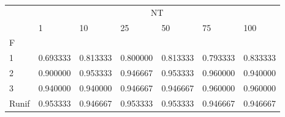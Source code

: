 \begin{table}[htbp]
\centering
\label{iris-results}
\begin{tabular}{lllllll}
\toprule
 & \multicolumn{6}{c}{NT} \\
 & 1 & 10 & 25 & 50 & 75 & 100 \\
F &  &  &  &  &  &  \\
\midrule
1 & 0.693333 & 0.813333 & 0.800000 & 0.813333 & 0.793333 & 0.833333 \\
2 & 0.900000 & 0.953333 & 0.946667 & 0.953333 & 0.960000 & 0.940000 \\
3 & 0.940000 & 0.940000 & 0.946667 & 0.946667 & 0.960000 & 0.960000 \\
Runif & 0.953333 & 0.946667 & 0.953333 & 0.953333 & 0.946667 & 0.946667 \\
\bottomrule
\end{tabular}
\end{table}

